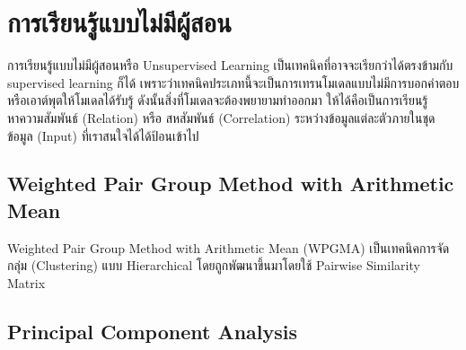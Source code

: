 

\chapter{การเรียนรู้แบบไม่มีผู้สอน}
\label{ch:unsup_ml}

การเรียนรู้แบบไม่มีผู้สอนหรือ Unsupervised Learning เป็นเทคนิคที่อาจจะเรียกว่าได้ตรงข้ามกับ supervised learning ก็ได้
เพราะว่าเทคนิคประเภทนี้จะเป็นการเทรนโมเดลแบบไม่มีการบอกคำตอบหรือเอาต์พุตให้โมเดลได้รับรู้ ดังนั้นสิ่งที่โมเดลจะต้องพยายามทำออกมา
ให้ได้คือเป็นการเรียนรู้หาความสัมพันธ์ (Relation) หรือ สหสัมพันธ์ (Correlation) ระหว่างข้อมูลแต่ละตัวภายในชุดข้อมูล (Input) 
ที่เราสนใจได้ได้ป้อนเข้าไป

\section{Weighted Pair Group Method with Arithmetic Mean}

Weighted Pair Group Method with Arithmetic Mean (WPGMA) เป็นเทคนิคการจัดกลุ่ม (Clustering) แบบ Hierarchical 
โดยถูกพัฒนาขึ้นมาโดยใช้ Pairwise Similarity Matrix\cite{sokal1958} 

\section{Principal Component Analysis}

